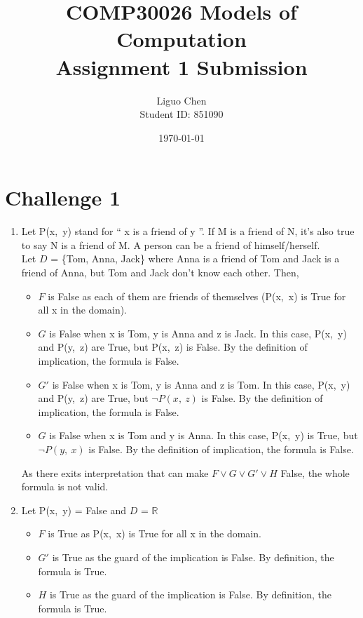\documentclass{article}
\title{COMP30026 Models of Computation \\ 
       Assignment 1 Submission}
\author{Liguo Chen\\Student ID: 851090}
\date{\today}
\begin{document}
\maketitle

\section*{Challenge 1}

\begin{enumerate}
    \item
    Let P(x,\ y) stand for `` x is a friend of y ''. If M is a friend of N, it's also true to say N is a friend of M. A person can be a friend of himself/herself.\\
    Let $D$ = \{Tom, Anna, Jack\} where Anna is a friend of Tom and Jack is a friend of Anna, but Tom and Jack don't know each other. Then,
    \begin{itemize}
    \setlength{\itemsep}{1pt}
        \item 
        $F$ is False as each of them are friends of themselves (P(x,\  x) is True for all x in the domain).
        \item
        $G$ is False when x is Tom, y is Anna and z is Jack. In this case, P(x,\ y) and P(y,\ z) are True, but P(x,\ z) is False. By the definition of implication, the formula is False.
        \item
        $G'$ is False when x is Tom, y is Anna and z is Tom. In this case, P(x,\ y) and P(y,\ z) are True, but $\neg P(x,\ z)$ is False. By the definition of implication, the formula is False.
        \item
        $G$ is False when x is Tom and y is Anna. In this case, P(x,\ y) is True, but $\neg P(y,\ x)$ is False. By the definition of implication, the formula is False.
    \end{itemize}
    As there exits interpretation that can make $F \vee G \vee G' \vee H$ False, the whole formula is not valid.
    \item
    Let P(x,\ y) = False and $D$ = $\mathbb{R}$
    \begin{itemize}
        \item 
        $F$ is True as P(x,\ x) is True for all x in the domain.
        \item
        $G'$ is True as the guard of the implication is False. By definition, the formula is True.
        \item
        $H$ is True as the guard of the implication is False. By definition, the formula is True. 

\end{itemize}
\end{enumerate}
\end{document}
